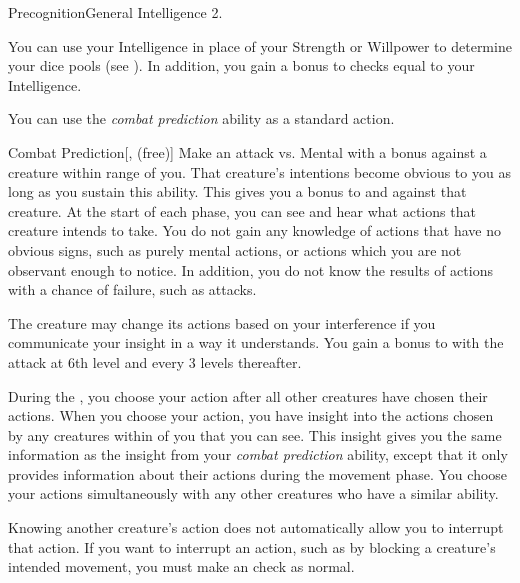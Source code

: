     \begin{feat}{Precognition}{General}
        \featpre Intelligence 2.

         You can use your Intelligence in place of your Strength or Willpower to determine your dice pools (see ).
        In addition, you gain a bonus to  checks equal to your Intelligence.

         You can use the \textit{combat prediction} ability as a standard action.
        \begin{freeability}{Combat Prediction}[,  (free)]
            Make an attack vs. Mental with a   bonus against a creature within \rngmed range of you.
            \hit That creature's intentions become obvious to you as long as you sustain this ability.
            This gives you a  bonus to  and  against that creature.
            At the start of each phase, you can see and hear what actions that creature intends to take.
            You do not gain any knowledge of actions that have no obvious signs, such as purely mental actions, or actions which you are not observant enough to notice.
            In addition, you do not know the results of actions with a chance of failure, such as attacks.

            The creature may change its actions based on your interference if you communicate your insight in a way it understands.
            \rankline
            You gain a  bonus to  with the attack at 6th level and every 3 levels thereafter.
        \end{freeability}

         During the , you choose your action after all other creatures have chosen their actions.
        When you choose your action, you have insight into the actions chosen by any creatures within \shortrange of you that you can see.
        This insight gives you the same information as the insight from your \textit{combat prediction} ability, except that it only provides information about their actions during the movement phase.
        You choose your actions simultaneously with any other creatures who have a similar ability.

        Knowing another creature's action does not automatically allow you to interrupt that action.
        If you want to interrupt an action, such as by blocking a creature's intended movement, you must make an  check as normal.


\end{feat}
